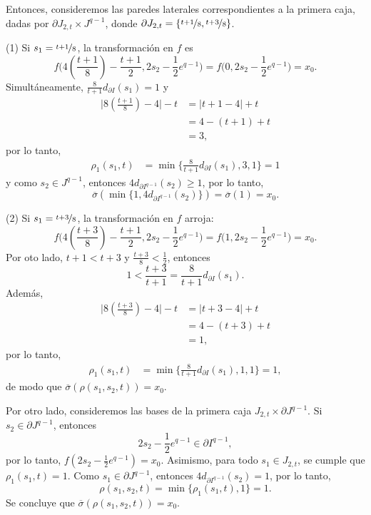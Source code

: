 \begin{dem}
    Entonces, consideremos las paredes laterales correspondientes a la primera caja, dadas por $\partial J_{2,t} \times J^{q-1}$, donde $\partial J_{2,t} = \{ \nicefrac{t+1}{8}, \nicefrac{t+3}{8} \}$. 
    
    (1) Si $s_1 = \nicefrac{t+1}{8}$, la transformación en $f$ es
    \[
        f\big(4(\textstyle\frac{t+1}{8}) - \frac{t+1}{2}, 2s_2 - \frac{1}{2}e^{q-1}\big) = f\big(0, 2s_2 - \frac{1}{2}e^{q-1}\big) = x_0.
    \] 
    Simultáneamente, $\frac{8}{t+1}d_{\partial I}(s_1)=1$ y
    \begin{align*}
        \big|8\textstyle(\frac{t+1}{8})-4\big|-t&=|t+1-4|+t\\
        &=4-(t+1)+t\\
        &=3,
    \end{align*}
    por lo tanto,
    \begin{align*}
        \rho_1(s_1,t)&=\min\{\textstyle\frac{8}{t+1}d_{\partial I}(s_1),3,1\}=1
    \end{align*}
    y como $s_2\in J^{q-1}$, entonces $4d_{\partial I^{q-1}}(s_2)\geq 1$,  por lo tanto,
    \[
        \overline{\sigma}(\min\{1, 4d_{\partial I^{q-1}}(s_2)\}) = \overline{\sigma}(1) = x_0.
    \]
    
    (2) Si $s_1 = \nicefrac{t+3}{8}$, la transformación en $f$ arroja:
    \[
        f\big(4(\textstyle\frac{t+3}{8}) - \frac{t+1}{2}, 2s_2 - \frac{1}{2}e^{q-1}\big) = f\big(1, 2s_2 - \frac{1}{2}e^{q-1}\big) = x_0.
    \] 
    Por oto lado, $t+1<{t+3}$ y $\frac{t+3}{8}<\frac{1}{2}$, entonces
    \begin{equation*}
        1<\frac{t+3}{t+1}=\frac{8}{t+1}d_{\partial I}(s_1).
    \end{equation*}
    Además,
    \begin{align*}
        \big|8\textstyle(\frac{t+3}{8})-4\big|-t&=|t+3-4|+t\\
        &=4-(t+3)+t\\
        &=1,
    \end{align*}
    por lo tanto, 
    \begin{align*}
        \rho_1(s_1,t)&=\min\{\textstyle\frac{8}{t+1}d_{\partial I}(s_1),1,1\}=1,
    \end{align*}
    de modo que $\overline{\sigma}(\rho(s_1,s_2,t))= x_0$.
        
    Por otro lado, consideremos las bases de la primera caja $J_{2,t} \times \partial J^{q-1}$. Si $s_2 \in \partial J^{q-1}$, entonces 
    $$2s_2-\frac{1}{2}e^{q-1}\in\partial I^{q-1},$$ por lo tanto, $f(2s_2-\frac{1}{2}e^{q-1})=x_0$. Asimismo, para todo $s_1 \in J_{2,t}$, se cumple que $\rho_1(s_1, t)=1$. Como $s_1\in\partial J^{q-1}$, entonces $4d_{\partial I^{q-1}}(s_2)=1$, por lo tanto,
    $$\rho(s_1,s_2,t)=\min\{\rho_1(s_1,t), 1\} = 1.$$ 
    Se concluye que  $\overline{\sigma}(\rho(s_1,s_2,t)) = x_0$.


\end{dem}
